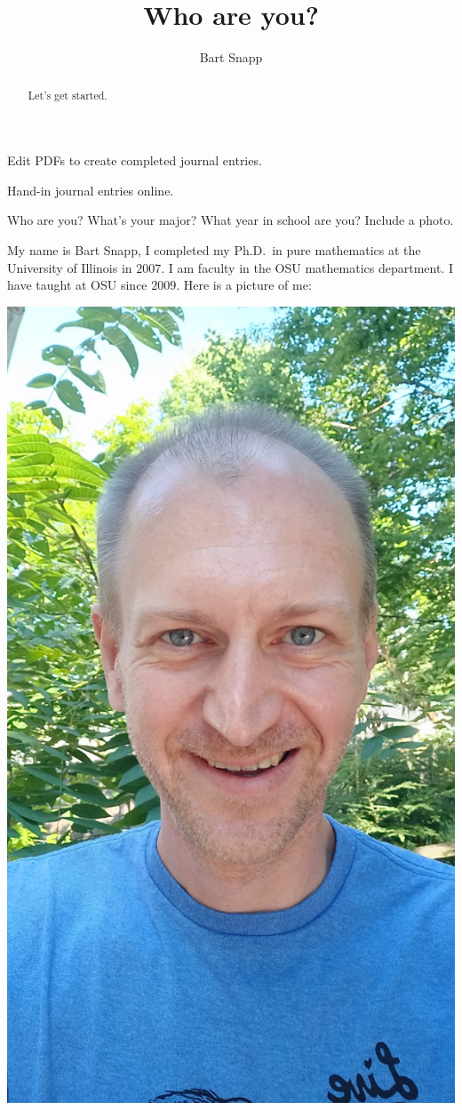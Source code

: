 \documentclass[nooutcomes,noauthor]{ximera}
\title{Who are you?}
\author{Bart Snapp}
\begin{document}
\begin{abstract}
  Let's get started.
\end{abstract}
\maketitle

\begin{listOutcomes}
\item{Edit PDFs to create completed journal entries.}
\item{Hand-in journal entries online.}
\end{listOutcomes}
\mynewpage

\begin{question}
  Who are you? What's your major? What year in school are you? Include a photo.
  \begin{freeResponse}
    My name is Bart Snapp, I completed my Ph.D.\ in pure mathematics
    at the University of Illinois in $2007$.  I am faculty in the OSU
    mathematics department. I have taught at OSU since $2009$. Here is
    a picture of me:
    \begin{center}
      \includegraphics[height=.3\textheight]{me.jpg}

\end{center}
\end{freeResponse}
\end{question}
\end{document}
